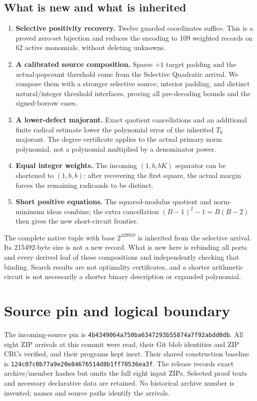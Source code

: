 \documentclass[11pt]{article}
\newcommand{\pin}{\texttt{4b4349064a750ba6347293b55874a7f92abdd0db}}
\begin{document}
\subsection{What is new and what is inherited}
\begin{enumerate}
\item \textbf{Selective positivity recovery.} Twelve guarded coordinates
suffice. This is a proved zero-set bijection and reduces the encoding to
109 weighted records on 62 active monomials, without deleting unknowns.
\item \textbf{A calibrated source composition.} Sparse $+1$ target padding
and the actual-popcount threshold come from the Selective Quadratic
arrival. We compose them with a stronger selective source, interior padding,
and distinct natural/integer threshold interfaces, proving all pre-decoding
bounds and the signed-borrow cases.
\item \textbf{A lower-defect majorant.} Exact quotient cancellations and an
additional finite radical estimate lower the polynomial error of the
inherited $T_6$ majorant. The degree certificate applies to the actual
primary norm polynomial, not a polynomial multiplied by a denominator power.
\item \textbf{Equal integer weights.} The incoming $(1,b,bK)$ separator can
be shortened to $(1,b,b)$: after recovering the first square, the actual
margin forces the remaining radicands to be distinct.
\item \textbf{Short positive equations.} The squared-modulus quotient and
norm-minimum ideas combine; the extra cancellation
$(B-1)^2-1=B(B-2)$ then gives the new short-circuit frontier.
\end{enumerate}
The complete native tuple with base $2^{429959}$ is inherited from the
selective arrival. Its 215492-byte size is not a new record. What is new
here is rebinding all ports and every derived leaf of these compositions
and independently checking that binding. Search results are not optimality
certificates, and a shorter arithmetic circuit is not necessarily a shorter
binary description or expanded polynomial.

\section{Source pin and logical boundary}
The incoming-source pin is \pin. All eight ZIP arrivals at this commit were
read, their Git blob identities and ZIP CRCs verified, and their programs
kept inert. Their shared construction baseline is
\texttt{124c07c0b77a9e20e84676514d8b1ff78536ea3f}. The release records exact
archive/member hashes but omits the full eight input ZIPs. Selected proof
texts and necessary declarative data are retained. No historical archive
number is invented; names and source paths identify the arrivals.
\end{document}
